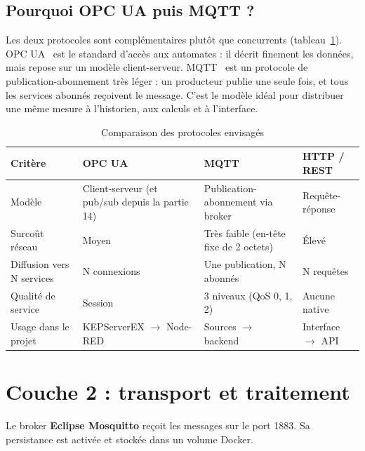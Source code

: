 \subsection*{Pourquoi OPC UA puis MQTT ?}
Les deux protocoles sont complémentaires plutôt que concurrents (tableau~\ref{tab:protocoles}). OPC UA~\cite{iec62541} est le standard d'accès aux automates : il décrit finement les données, mais repose sur un modèle client-serveur. MQTT~\cite{mqtt5} est un protocole de publication-abonnement très léger : un producteur publie une seule fois, et tous les services abonnés reçoivent le message. C'est le modèle idéal pour distribuer une même mesure à l'historien, aux calculs et à l'interface.

\begin{table}[H]
\centering
\caption{Comparaison des protocoles envisagés}
\label{tab:protocoles}
\begin{tabularx}{\textwidth}{lXXX}
\toprule
\textbf{Critère} & \textbf{OPC UA} & \textbf{MQTT} & \textbf{HTTP / REST} \\
\midrule
Modèle & Client-serveur (et pub/sub depuis la partie 14) & Publication-abonnement via broker & Requête-réponse \\
Surcoût réseau & Moyen & Très faible (en-tête fixe de 2 octets) & Élevé \\
Diffusion vers N services & N connexions & Une publication, N abonnés & N requêtes \\
Qualité de service & Session & 3 niveaux (QoS 0, 1, 2) & Aucune native \\
Usage dans le projet & KEPServerEX $\rightarrow$ Node-RED & Sources $\rightarrow$ backend & Interface $\rightarrow$ API \\
\bottomrule
\end{tabularx}
\end{table}

\section{Couche 2 : transport et traitement}
Le broker \textbf{Eclipse Mosquitto} reçoit les messages sur le port 1883. Sa persistance est activée et stockée dans un volume Docker.

